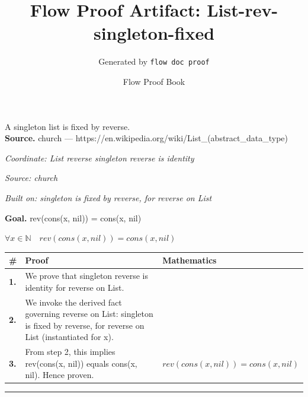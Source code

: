 \documentclass[11pt]{article}
\title{Flow Proof Artifact: List-rev-singleton-fixed}
\author{Generated by \texttt{flow doc proof}}
\date{Flow Proof Book}
\theoremstyle{definition}
\begin{document}
\maketitle
A singleton list is fixed by reverse.\\[0.5em]
\textbf{Source.} church — https://en.wikipedia.org/wiki/List\_(abstract\_data\_type)\\[0.5em]
\bigskip
{}\par
\smallskip\noindent\textit{Coordinate: List \cdot reverse \cdot singleton reverse is identity}\par
\smallskip\noindent\textit{Source: church}\par
\smallskip\noindent\textit{Built on: singleton is fixed by reverse, for reverse on List}\par
\medskip
\noindent\textbf{Goal.} rev(cons(x, nil)) = cons(x, nil)\par
\noindent$\displaystyle \forall x \in \mathbb{N}\quad rev(cons(x, nil)) = cons(x, nil)$\par
\medskip
\noindent
\begin{tabular}{@{} >{\raggedright\arraybackslash}p{} >{\raggedright\arraybackslash}p{} >{\raggedleft\arraybackslash}p{} @{}}
\textbf{\#} & \textbf{Proof} & \textbf{Mathematics} \\
\midrule
\textbf{1.} & We prove that singleton reverse is identity for reverse on List. & \\[0.45em]
\textbf{2.} & We invoke the derived fact governing reverse on List: singleton is fixed by reverse, for reverse on List (instantiated for x). & \\[0.45em]
\textbf{3.} & From step 2, this implies rev(cons(x, nil)) equals cons(x, nil). Hence proven. & $\displaystyle rev(cons(x, nil)) = cons(x, nil)$ \\[0.45em]
\bottomrule
\end{tabular}
\label{thm:List-reverse-singleton_reverse_is_identity}
\par\medskip\hrule
\end{document}
